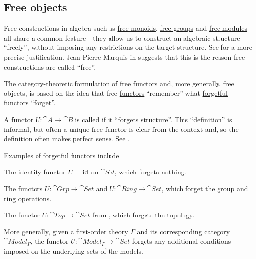 \subsection{Free objects}\label{subsec:free_objects}

\begin{remark}\label{rem:free_construction_etymology}
  Free constructions in algebra such as \hyperref[def:free_monoid]{free monoids}, \hyperref[def:free_group]{free groups} and \hyperref[def:free_left_module]{free modules} all share a common feature - they allow us to construct an algebraic structure \enquote{freely}, without imposing any restrictions on the target structure. See  for a more precise justification. Jean-Pierre Marquis in \cite{StanfordPlato:category_theory} suggests that this is the reason free constructions are called \enquote{free}.

  The category-theoretic formulation of free functors and, more generally, free objects, is based on the idea that free \hyperref[def:free_functor]{functors} \enquote{remember} what \hyperref[def:forgetful_functor]{forgetful functors} \enquote{forget}.
\end{remark}

\begin{definition}\label{def:forgetful_functor}
  A functor \( U: \cat{A} \to \cat{B} \) is called  if it \enquote{forgets structure}. This \enquote{definition} is informal, but often a unique free functor is clear from the context and, so the definition often makes perfect sense. See .
\end{definition}

\begin{example}\label{ex:forgetful_functors}
  Examples of forgetful functors include

  \begin{thmenum}
    \item The identity functor \( U = \operatorname{id} \) on \( \cat{Set} \), which forgets nothing.
    \item The functors \( U: \cat{Grp} \to \cat{Set} \) and \( U: \cat{Ring} \to \cat{Set} \), which forget the group and ring operations.
    \item The functor \( U: \cat{Top} \to \cat{Set} \) from , which forgets the topology.
    \item More generally, given a \hyperref[def:first_order_theory]{first-order theory} \( \Gamma \) and its corresponding category \( \cat{Model}_\Gamma \), the functor \( U: \cat{Model}_\Gamma \to \cat{Set} \) forgets any additional conditions imposed on the underlying sets of the models.
  \end{thmenum}
\end{example}

